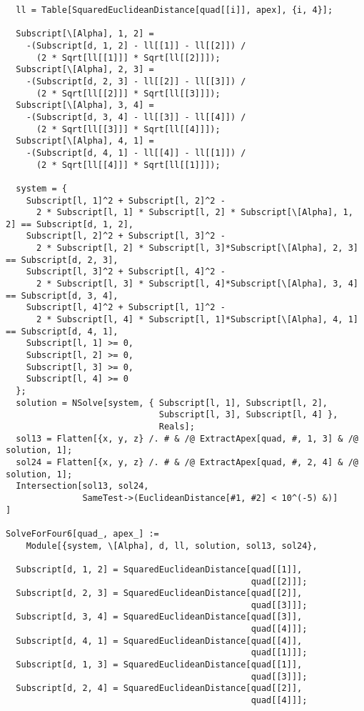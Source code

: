 \documentclass[../main.tex]{subfiles}
\begin{document}
\begin{lstlisting}
  ll = Table[SquaredEuclideanDistance[quad[[i]], apex], {i, 4}];

  Subscript[\[Alpha], 1, 2] =
    -(Subscript[d, 1, 2] - ll[[1]] - ll[[2]]) /
      (2 * Sqrt[ll[[1]]] * Sqrt[ll[[2]]]);
  Subscript[\[Alpha], 2, 3] =
    -(Subscript[d, 2, 3] - ll[[2]] - ll[[3]]) /
      (2 * Sqrt[ll[[2]]] * Sqrt[ll[[3]]]);
  Subscript[\[Alpha], 3, 4] =
    -(Subscript[d, 3, 4] - ll[[3]] - ll[[4]]) /
      (2 * Sqrt[ll[[3]]] * Sqrt[ll[[4]]]);
  Subscript[\[Alpha], 4, 1] =
    -(Subscript[d, 4, 1] - ll[[4]] - ll[[1]]) /
      (2 * Sqrt[ll[[4]]] * Sqrt[ll[[1]]]);

  system = {
    Subscript[l, 1]^2 + Subscript[l, 2]^2 -
      2 * Subscript[l, 1] * Subscript[l, 2] * Subscript[\[Alpha], 1, 2] == Subscript[d, 1, 2],
    Subscript[l, 2]^2 + Subscript[l, 3]^2 -
      2 * Subscript[l, 2] * Subscript[l, 3]*Subscript[\[Alpha], 2, 3] == Subscript[d, 2, 3],
    Subscript[l, 3]^2 + Subscript[l, 4]^2 -
      2 * Subscript[l, 3] * Subscript[l, 4]*Subscript[\[Alpha], 3, 4] == Subscript[d, 3, 4],
    Subscript[l, 4]^2 + Subscript[l, 1]^2 -
      2 * Subscript[l, 4] * Subscript[l, 1]*Subscript[\[Alpha], 4, 1] == Subscript[d, 4, 1],
    Subscript[l, 1] >= 0,
    Subscript[l, 2] >= 0,
    Subscript[l, 3] >= 0,
    Subscript[l, 4] >= 0
  };
  solution = NSolve[system, { Subscript[l, 1], Subscript[l, 2],
                              Subscript[l, 3], Subscript[l, 4] },
                              Reals];
  sol13 = Flatten[{x, y, z} /. # & /@ ExtractApex[quad, #, 1, 3] & /@ solution, 1];
  sol24 = Flatten[{x, y, z} /. # & /@ ExtractApex[quad, #, 2, 4] & /@ solution, 1];
  Intersection[sol13, sol24,
               SameTest->(EuclideanDistance[#1, #2] < 10^(-5) &)]
]

SolveForFour6[quad_, apex_] :=
    Module[{system, \[Alpha], d, ll, solution, sol13, sol24},

  Subscript[d, 1, 2] = SquaredEuclideanDistance[quad[[1]],
                                                quad[[2]]];
  Subscript[d, 2, 3] = SquaredEuclideanDistance[quad[[2]],
                                                quad[[3]]];
  Subscript[d, 3, 4] = SquaredEuclideanDistance[quad[[3]],
                                                quad[[4]]];
  Subscript[d, 4, 1] = SquaredEuclideanDistance[quad[[4]],
                                                quad[[1]]];
  Subscript[d, 1, 3] = SquaredEuclideanDistance[quad[[1]],
                                                quad[[3]]];
  Subscript[d, 2, 4] = SquaredEuclideanDistance[quad[[2]],
                                                quad[[4]]];


\end{lstlisting}
\end{document}
